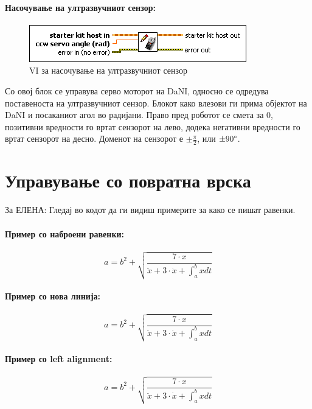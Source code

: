 \documentclass{article}
\begin{document}
\paragraph{Насочување на ултразвучниот сензор:\\}
\begin{figure}[h]
\includegraphics[width=0.45\linewidth]{write_servo.png}
\raggedright
\caption{VI за насочување на ултразвучниот сензор}
\label{fig:write_servo.png}
\end{figure}  
Со овој блок се управува серво моторот на DaNI, односно се одредува поставеноста на ултразвучниот сензор. Блокот како влезови ги прима објектот на DaNI и посаканиот агол во радијани. Право пред роботот се смета за 0, позитивни вредности го вртат сензорот на лево, додека негативни вредности го вртат сензорот на десно. Доменот на сензорот е $ \pm \frac{\pi}{2}$, или $\pm 90 \degree$.
 
\section{Управување со повратна врска}

За ЕЛЕНА:
Гледај во кодот да ги видиш примерите за како се пишат равенки.

\paragraph{Пример со наброени равенки:}
\begin{equation}
	a = b^2 + \sqrt{\frac{7 \cdot x}{{\ddot x + 3 \cdot \dot x + \int_a^b{x dt}}}}
\end{equation}


\paragraph{Пример со нова линија:}

$$ a = b^2 + \sqrt{\frac{7 \cdot x}{{\ddot x + 3 \cdot \dot x + \int_a^b{x dt}}}} $$



\paragraph{Пример со left alignment:}
\begin{flushleft}
$$ a = b^2 + \sqrt{\frac{7 \cdot x}{{\ddot x + 3 \cdot \dot x + \int_a^b{x dt}}}} $$
\end{flushleft}
\end{document}
